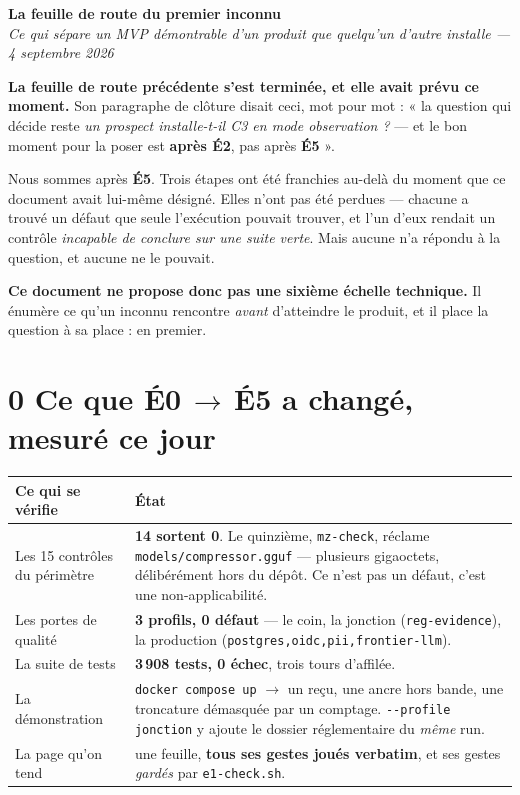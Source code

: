 \documentclass[11pt]{article}
\newcommand{\code}[1]{\texttt{\small #1}}
\newcommand{\best}[1]{{\color{efesolve}\textbf{#1}}}
\newcommand{\mm}[1]{\textbf{#1}}
\newcommand{\fl}{$\rightarrow$}
\begin{document}
\begin{center}
{\Huge\bfseries\color{efenavy} La feuille de route du premier inconnu}\\[3pt]
{\large\color{efegray}\itshape Ce qui sépare un MVP démontrable d'un produit que quelqu'un
d'autre installe --- 4 septembre 2026}
\end{center}
\vspace{2pt}

\begin{these}
\textbf{La feuille de route précédente s'est terminée, et elle avait prévu ce moment.} Son
paragraphe de clôture disait ceci, mot pour mot : « la question qui décide reste \emph{un prospect
installe-t-il C3 en mode observation ?} --- et le bon moment pour la poser est \textbf{après
\mm{É2}}, pas après \mm{É5} ».

Nous sommes après \mm{É5}. Trois étapes ont été franchies au-delà du moment que ce document avait
lui-même désigné. Elles n'ont pas été perdues --- chacune a trouvé un défaut que seule l'exécution
pouvait trouver, et l'un d'eux rendait un contrôle \emph{incapable de conclure sur une suite
verte}. Mais aucune n'a répondu à la question, et aucune ne le pouvait.

\textbf{Ce document ne propose donc pas une sixième échelle technique.} Il énumère ce qu'un
inconnu rencontre \emph{avant} d'atteindre le produit, et il place la question à sa place :
en premier.
\end{these}

\section{0 \;\textbar\; Ce que \mbox{É0}\,\fl\,\mbox{É5} a changé, mesuré ce jour}

\begin{center}\small
\renewcommand{\arraystretch}{1.25}
\begin{tabular}{@{}>{\raggedright\arraybackslash}p{5.6cm} >{\raggedright\arraybackslash}p{9.6cm}@{}}
\toprule
\textbf{Ce qui se vérifie} & \textbf{État} \\
\midrule
Les 15 contrôles du périmètre & \best{14 sortent 0}. Le quinzième, \code{mz-check}, réclame
\code{models/compressor.gguf} --- plusieurs gigaoctets, délibérément hors du dépôt. Ce n'est pas
un défaut, c'est une non-applicabilité. \\
Les portes de qualité & \best{3 profils, 0 défaut} --- le coin, la jonction
(\code{reg-evidence}), la production (\code{postgres,oidc,pii,frontier-llm}). \\
La suite de tests & \best{3\,908 tests, 0 échec}, trois tours d'affilée. \\
La démonstration & \code{docker compose up} \fl{} un reçu, une ancre hors bande, une troncature
démasquée par un comptage. \code{-{}-profile jonction} y ajoute le dossier réglementaire du
\emph{même} run. \\
La page qu'on tend & une feuille, \best{tous ses gestes joués verbatim}, et ses gestes
\emph{gardés} par \code{e1-check.sh}. \\
\bottomrule
\end{tabular}
\end{center}
\end{document}
